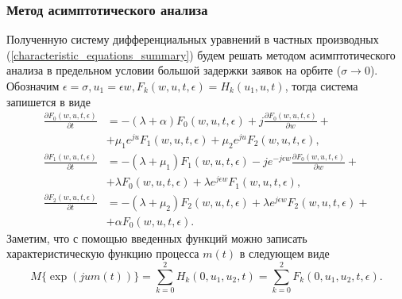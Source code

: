 \subsubsection{Метод асимптотического анализа}
Полученную систему дифференциальных уравнений в частных производных (\ref{characteristic_equations_summary}) будем решать методом асимптотического анализа \cite{nazarov2017asymptotic} в предельном условии большой задержки заявок на орбите ($\sigma \rightarrow 0$).
Обозначим $\epsilon = \sigma,   u_{1}= \epsilon w,   F_{k}(w,u,t,\epsilon) = H_{k}(u_{1},u,t)$, тогда система запишется в виде
\begin{equation} \label{asymptotic_equations_summary}
	\begin{split}
		\frac{{\partial F_{0}(w,u,t,\epsilon)}}{{\partial t}} &= -(\lambda + \alpha)F_{0}(w,u,t,\epsilon) + j
		\frac{{\partial F_{0}(w,u,t,\epsilon)}}{{\partial w}} +\\  &+ \mu_{1} e^{ju}F_{1}(w,u,t,\epsilon) + \mu_{2}e^{ju}F_{2}(w,u,t,\epsilon) ,
		\\
		\frac{{\partial F_{1}(w,u,t,\epsilon)}}{{\partial t}} &= -(\lambda + \mu_{1})F_{1}(w,u,t,\epsilon) - j e^{-j\epsilon w}
		\frac{{\partial F_{0}(w,u,t,\epsilon)}}{{\partial w}} +\\  &+ \lambda F_{0}(w,u,t,\epsilon) + \lambda e^{j\epsilon w}F_{1}(w,u,t,\epsilon) ,
		\\
		\frac{{\partial F_{2}(w,u,t,\epsilon)}}{{\partial t}} &= -(\lambda + \mu_{2})F_{2}(w,u,t,\epsilon)  + \lambda e^{j\epsilon w}F_{2}(w,u,t,\epsilon) +\\  &+ \alpha F_{0}(w,u,t,\epsilon).
	\end{split}
\end{equation}  
Заметим, что с помощью введенных функций можно записать характеристическую функцию процесса $m(t)$ в следующем виде
\begin{equation*}
	M\{\exp(jum(t))\}=\sum_{k=0}^{2}H_{k}(0,u_{1},u_{2},t) = \sum_{k=0}^{2}F_{k}(0,u_{1},u_{2},t,\epsilon).
\end{equation*}

